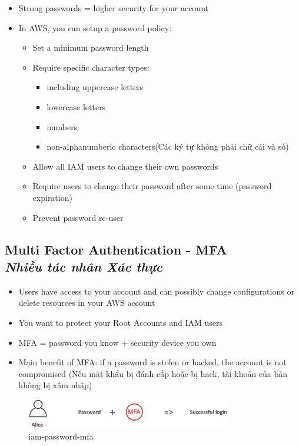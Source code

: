\begin{itemize}
	\item Strong passwords = higher security for your account
	\item In AWS, you can setup a password policy:
	\begin{itemize}
		\item Set a minimum password length
		\item Require specific character types:
		\begin{itemize}
			\item including uppercase letters
			\item lowercase letters
			\item numbers
			\item non-alphanumberic characters(Các ký tự không phải chữ cái và số)
		\end{itemize}
		\item Allow all IAM users to change their own passwords
		\item Require users to change their password after some time (password expiration)
		\item Prevent password re-user
	\end{itemize}
\end{itemize}


\subsection[Multi Factor Authentication - MFA]{Multi Factor Authentication - MFA \\ \textit{Nhiều tác nhân Xác thực}}

\begin{itemize}
	\item Users have access to your account and can possibly change configurations or delete resources in your AWS account 
	\item You want to protect your Root Accounts and IAM users
	\item MFA = password you know + security device you own
	\item Main benefit of MFA: if a password is stolen or hacked, the account is not compromised (Nếu mật khẩu bị đánh cắp hoặc bị hack, tài khoản của bản không bị xâm nhập)
\end{itemize}
	\begin{figure}[htbp]
		\centering
		\includegraphics[width=0.8\textwidth]{images/iam-password-mfa}
		\caption{iam-password-mfa}
		\label{fig:iam-password-mfa}
	\end{figure}

